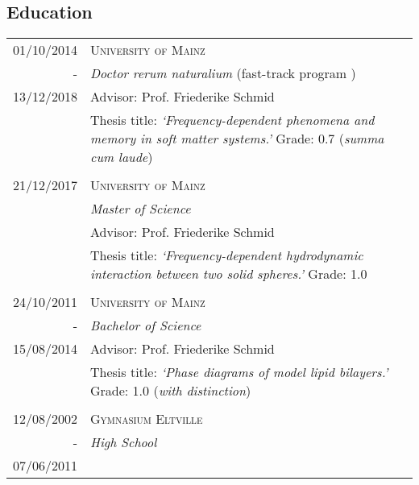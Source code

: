 \subsection*{Education}
\begin{tabular}{r|p{14cm}}	
	
		\textsc{01/10/2014 }& \textsc{University of Mainz } \\\textsc{}-&\emph{Doctor rerum naturalium} (fast-track program )\\ 13/12/2018&\footnotesize{Advisor: Prof. Friederike Schmid}
	\\&\footnotesize{Thesis title: \emph{`Frequency-dependent phenomena and memory in soft matter systems.'}}
	\footnotesize{Grade: 0.7 (\emph{summa cum laude})}
	\\\multicolumn{2}{c}{}\\
	
		\textsc{21/12/2017}& \textsc{University of Mainz } \\\textsc{}&\emph{Master of Science}\\&\footnotesize{Advisor: Prof. Friederike Schmid}
	\\&\footnotesize{Thesis title: \emph{`Frequency-dependent hydrodynamic interaction between two
			solid spheres.'}}
	\footnotesize{Grade: 1.0}
	\\\multicolumn{2}{c}{}\\
	
	\textsc{24/10/2011}& \textsc{University of Mainz } \\ - &\emph{Bachelor of Science}\\15/08/2014&\footnotesize{Advisor: Prof. Friederike Schmid}
\\&\footnotesize{Thesis title: \emph{`Phase diagrams of model lipid bilayers.'}}
\footnotesize{Grade: 1.0 (\emph{with distinction})}
\\\multicolumn{2}{c}{}\\
	

	\textsc{12/08/2002 } &  \textsc{Gymnasium Eltville}\\
		- &  \emph{High School}\\
		07/06/2011 &
	
\end{tabular}


